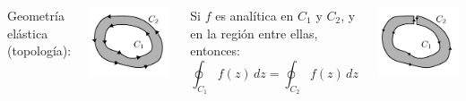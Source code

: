\documentclass[9pt, aspectratio=169]{beamer}
\begin{document}
\begin{frame}
	\begin{columns}[t]
		\cx
		Geometría elástica (topología):
		\begin{center}
			\includegraphics[scale=0.45]{figs/fig-09.pdf}
		\end{center}

		Si $f$ es analítica en $C_1$ y $C_2$, y en la región entre ellas, entonces:
		\[ \oint_{C_1} f(z) \, dz = \oint_{C_2} f(z) \, dz \]
		\begin{center}
			\includegraphics[scale=0.45]{figs/fig-09b.pdf}
		\end{center}


\end{columns}
\end{frame}
\end{document}
